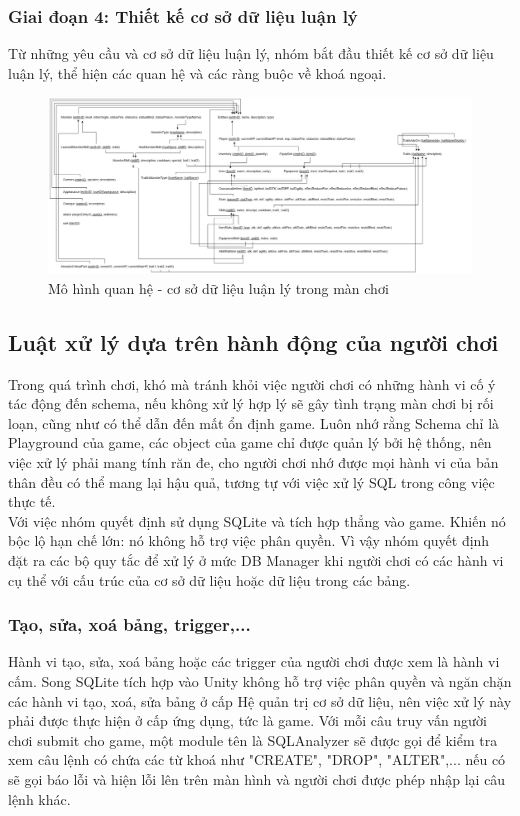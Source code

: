 \subsubsection{Giai đoạn 4: Thiết kế cơ sở dữ liệu luận lý}
\hspace*{0.5cm} Từ những yêu cầu và cơ sở dữ liệu luận lý, nhóm bắt đầu thiết kế cơ sở dữ liệu luận lý, thể hiện các quan hệ và các ràng buộc về khoá ngoại.
\begin{figure}[H]
	\centering
	\includegraphics[width=\textwidth]{Images/rm.jpg}
	\vspace{0.5cm}
	\caption{Mô hình quan hệ - cơ sở dữ liệu luận lý trong màn chơi}
\end{figure}





\subsection{Luật xử lý dựa trên hành động của người chơi}
\hspace*{0.5cm} Trong quá trình chơi, khó mà tránh khỏi việc người chơi có những hành vi cố ý tác động đến schema, nếu không xử lý hợp lý sẽ gây tình trạng màn chơi bị rối loạn, cũng như có thể dẫn đến mất ổn định game. Luôn nhớ rằng Schema chỉ là Playground của game, các object của game chỉ được quản lý bởi hệ thống, nên việc xử lý phải mang tính răn đe, cho người chơi nhớ được mọi hành vi của bản thân đều có thể mang lại hậu quả, tương tự với việc xử lý SQL trong công việc thực tế.\\

\hspace*{0.5cm} Với việc nhóm quyết định sử dụng SQLite và tích hợp thẳng vào game. Khiến nó bộc lộ hạn chế lớn: nó không hỗ trợ việc phân quyền. Vì vậy nhóm quyết định đặt ra các bộ quy tắc để xử lý ở mức DB Manager khi người chơi có các hành vi cụ thể với cấu trúc của cơ sở dữ liệu hoặc dữ liệu trong các bảng.
\subsubsection{Tạo, sửa, xoá bảng, trigger,...}
\hspace*{0.5cm} Hành vi tạo, sửa, xoá bảng hoặc các trigger của người chơi được xem là hành vi cấm. Song SQLite tích hợp vào Unity không hỗ trợ việc phân quyền và ngăn chặn các hành vi tạo, xoá, sửa bảng ở cấp Hệ quản trị cơ sở dữ liệu, nên việc xử lý này phải được thực hiện ở cấp ứng dụng, tức là game. Với mỗi câu truy vấn người chơi submit cho game, một module tên là SQLAnalyzer sẽ được gọi để kiểm tra xem câu lệnh có chứa các từ khoá như "CREATE", "DROP", "ALTER",... nếu có sẽ gọi báo lỗi và hiện lỗi lên trên màn hình và người chơi được phép nhập lại câu lệnh khác. 
